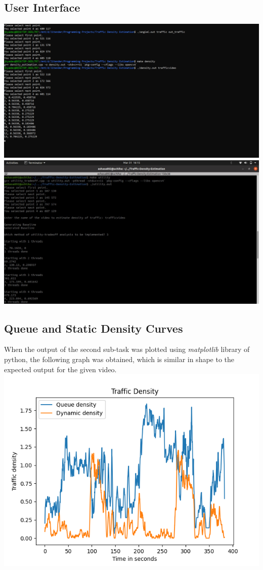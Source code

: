 \documentclass{article} %
\begin{document}
\subsection{User Interface}
\includegraphics[trim = 0cm 4.5cm 13cm 0cm, clip=true, scale = 0.44]{user_interface/densityIO.png}
\vspace{2pt}
\\\includegraphics[trim=0cm 1cm 17cm 2.5cm, clip=true, scale = 0.57]{user_interface/utility_IO.jpeg}

\subsection{Queue and Static Density Curves}
When the output of the second sub-task was plotted using \textit{matplotlib} library of python, the following graph was obtained, which is similar in shape to the expected output for the given video.
\\\includegraphics[]{out_images/out_graph.png}
\end{document}
